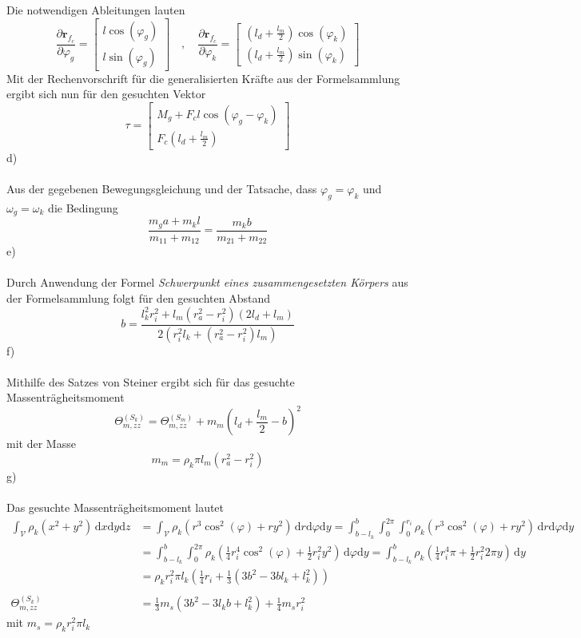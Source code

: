 Die notwendigen Ableitungen lauten
\[
	\frac{\partial \textbf{r}_{f_c}}{\partial \varphi_g} = \begin{bmatrix}
			l\cos(\varphi_g) \\
			l\sin(\varphi_g)
		\end{bmatrix}
		\quad,\quad
		\frac{\partial \textbf{r}_{f_c}}{\partial \varphi_k} = \begin{bmatrix}
			\left(l_d + \frac{l_m}{2}\right)\cos(\varphi_k) \\
			\left(l_d + \frac{l_m}{2}\right)\sin(\varphi_k)
			\end{bmatrix}
\]
Mit der Rechenvorschrift für die generalisierten Kräfte aus der Formelsammlung ergibt sich nun für den gesuchten Vektor
\[
	\tau = \begin{bmatrix}
		M_g + F_cl\cos(\varphi_g - \varphi_k) \\
		F_c\left(l_d + \frac{l_m}{2}\right)
	\end{bmatrix}
\]
d)\\ \\
Aus der gegebenen Bewegungsgleichung und der Tatsache, dass $\varphi_g = \varphi_k$ und $\omega_g = \omega_k$ die Bedingung
\[
	\frac{m_ga + m_kl}{m_{11} + m_{12}} = \frac{m_kb}{m_{21} + m_{22}}
\]
\newpage
\noindent
e)\\ \\
Durch Anwendung der Formel \textit{Schwerpunkt eines zusammengesetzten Körpers} aus der Formelsammlung folgt für den gesuchten Abstand
\[
	b = \frac{l_k^2r_i^2 + l_m(r_a^2 - r_i^2)(2l_d + l_m)}{2\left(r_i^2l_k + (r_a^2 - r_i^2)l_m\right)}
\]
f)\\ \\
Mithilfe des Satzes von Steiner ergibt sich für das gesuchte Massenträgheitsmoment
\[
	\varTheta_{m,zz}^{(S_k)} = \varTheta_{m,zz}^(S_m) + m_m\left(l_d + \frac{l_m}{2} - b\right)^2 
\]
mit der Masse
\[
	m_m = \rho_k\pi l_m(r_a^2 - r_i^2)
\]
g)\\ \\
Das gesuchte Massenträgheitsmoment lautet
\begin{align*}
	\int_{\mathcal{V}}\rho_k(x^2 + y^2)\,\text{d}x\text{d}y\text{d}z &= \int_{\mathcal{V}}\rho_k(r^3\cos^2(\varphi) + ry^2)\,\text{d}r\text{d}\varphi\text{d}y = 
	\int_{b - l_k}^{b}\int_{0}^{2\pi}\int_{0}^{r_i}\rho_k(r^3\cos^2(\varphi) + ry^2)\,\text{d}r\text{d}\varphi\text{d}y \\
	&= 	\int_{b - l_k}^{b}\int_{0}^{2\pi}\rho_k\left(\frac{1}{4}r_i^4\cos^2(\varphi) + \frac{1}{2}r_i^2y^2\right)\,\text{d}\varphi\text{d}y = 	\int_{b - l_k}^{b}\rho_k\left(\frac{1}{4}r_i^4\pi + \frac{1}{2}r_i^2 2\pi y\right)\, \text{d}y \\
	&= \rho_kr_i^2\pi l_k\left(\frac{1}{4}r_i + \frac{1}{3}(3b^2 - 3bl_k + l_k^2)\right) \\ \\
	\varTheta_{m,zz}^{(S_k)} &= \frac{1}{3}m_s(3b^2 - 3l_kb + l_k^2) + \frac{1}{4}m_sr_i^2
\end{align*}
mit $m_s = \rho_kr_i^2\pi l_k$ \\ \\